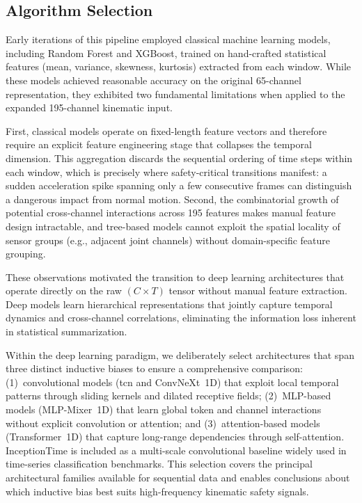 \documentclass[3p,times,procedia]{elsarticle}
\begin{document}
\subsection{Algorithm Selection}

Early iterations of this pipeline employed classical machine learning models, including Random Forest and XGBoost, trained on hand-crafted statistical features (mean, variance, skewness, kurtosis) extracted from each window. While these models achieved reasonable accuracy on the original 65-channel representation, they exhibited two fundamental limitations when applied to the expanded 195-channel kinematic input.

First, classical models operate on fixed-length feature vectors and therefore require an explicit feature engineering stage that collapses the temporal dimension. This aggregation discards the sequential ordering of time steps within each window, which is precisely where safety-critical transitions manifest: a sudden acceleration spike spanning only a few consecutive frames can distinguish a dangerous impact from normal motion. Second, the combinatorial growth of potential cross-channel interactions across 195 features makes manual feature design intractable, and tree-based models cannot exploit the spatial locality of sensor groups (e.g., adjacent joint channels) without domain-specific feature grouping.

These observations motivated the transition to deep learning architectures that operate directly on the raw $(C \times T)$ tensor without manual feature extraction. Deep models learn hierarchical representations that jointly capture temporal dynamics and cross-channel correlations, eliminating the information loss inherent in statistical summarization.

Within the deep learning paradigm, we deliberately select architectures that span three distinct inductive biases to ensure a comprehensive comparison: (1)~convolutional models (\ac{tcn} and ConvNeXt~1D) that exploit local temporal patterns through sliding kernels and dilated receptive fields; (2)~MLP-based models (MLP-Mixer~1D) that learn global token and channel interactions without explicit convolution or attention; and (3)~attention-based models (Transformer~1D) that capture long-range dependencies through self-attention. InceptionTime is included as a multi-scale convolutional baseline widely used in time-series classification benchmarks. This selection covers the principal architectural families available for sequential data and enables conclusions about which inductive bias best suits high-frequency kinematic safety signals.
\end{document}
